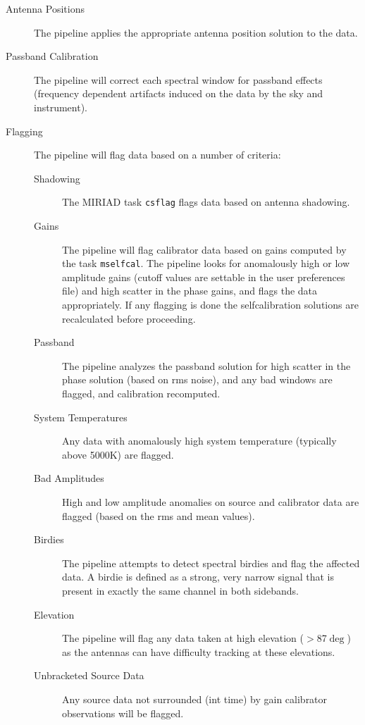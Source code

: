 \begin{description}
\item[Antenna Positions] The pipeline applies the appropriate antenna position solution to the data.
\item[Passband Calibration] The pipeline will correct each spectral window for passband effects (frequency dependent artifacts induced on the data by the sky and instrument).
\item[Flagging] The pipeline will flag data based on a number of criteria:
\begin{description}
\item[Shadowing] The MIRIAD task \verb#csflag# flags data based on antenna shadowing.
\item[Gains] The pipeline will flag calibrator data based on gains computed by the task \verb#mselfcal#. The pipeline looks for anomalously high or low amplitude gains (cutoff values are settable in the user preferences file) and high scatter in the phase gains, and flags the data appropriately. If any flagging is done the selfcalibration solutions are recalculated before proceeding.
\item[Passband] The pipeline analyzes the passband solution for high scatter in the phase solution (based on rms noise), and any bad windows are flagged, and calibration recomputed.
\item[System Temperatures] Any data with anomalously high system temperature (typically above 5000K) are flagged.
\item[Bad Amplitudes] High and low amplitude anomalies on source and calibrator data are flagged (based on the rms and mean values).
\item[Birdies] The pipeline attempts to detect spectral birdies and flag the affected data. A birdie is defined as a strong, very narrow signal that is present in exactly the same channel in both sidebands.
\item[Elevation] The pipeline will flag any data taken at high elevation ($>$87$\deg$) as the antennas can have difficulty tracking at these elevations.
\item[Unbracketed Source Data] Any source data not surrounded (int time) by gain calibrator observations will be flagged.

\end{description}
\end{description}
